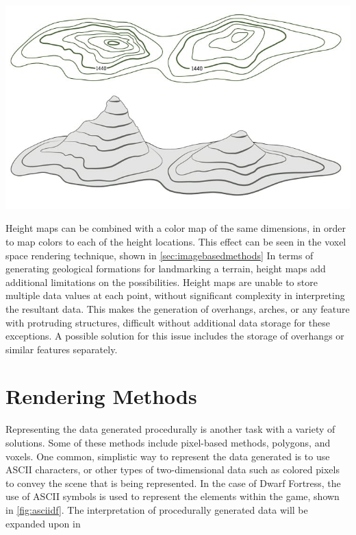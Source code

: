 \documentclass[10pt]{report}
\begin{document}
			\begin{minipage}{\textwidth}
				\centering
				\includegraphics[scale=.5]{top-map}
				\label{fig:top-map}
			\end{minipage} 
		
			Height maps can be combined with a color map of the same dimensions, in order to map colors to each of the height locations. This effect can be seen in the voxel space rendering technique, shown in \ref{sec:imagebasedmethods} In terms of generating geological formations for landmarking a terrain, height maps add additional limitations on the possibilities. Height maps are unable to store multiple data values at each point, without significant complexity in interpreting the resultant data. This makes the generation of overhangs, arches, or any feature with protruding structures, difficult without additional data storage for these exceptions. A possible solution for this issue includes the storage of overhangs or similar features separately.
		
	\vspace{10pt}
	\let\clearpage\relax
	\chapter{Rendering Methods}
	
		Representing the data generated procedurally is another task with a variety of solutions. Some of these methods include pixel-based methods, polygons, and voxels. One common, simplistic way to represent the data generated is to use ASCII characters, or other types of two-dimensional data such as colored pixels to convey the scene that is being represented. In the case of Dwarf Fortress, the use of ASCII symbols is used to represent the elements within the game, shown in \autoref{fig:asciidf}. The interpretation of procedurally generated data will be expanded upon in 
		
\end{document}
